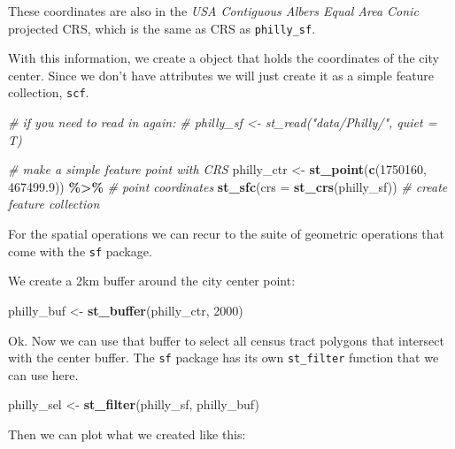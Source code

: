 \documentclass[
]{book}
\newenvironment{Shaded}{\begin{snugshade}}{\end{snugshade}}
\newcommand{\AttributeTok}[1]{\textcolor[rgb]{0.13,0.29,0.53}{#1}}
\newcommand{\CommentTok}[1]{\textcolor[rgb]{0.56,0.35,0.01}{\textit{#1}}}
\newcommand{\DecValTok}[1]{\textcolor[rgb]{0.00,0.00,0.81}{#1}}
\newcommand{\FloatTok}[1]{\textcolor[rgb]{0.00,0.00,0.81}{#1}}
\newcommand{\FunctionTok}[1]{\textcolor[rgb]{0.13,0.29,0.53}{\textbf{#1}}}
\newcommand{\NormalTok}[1]{#1}
\newcommand{\OtherTok}[1]{\textcolor[rgb]{0.56,0.35,0.01}{#1}}
\newcommand{\SpecialCharTok}[1]{\textcolor[rgb]{0.81,0.36,0.00}{\textbf{#1}}}
\begin{document}
These coordinates are also in the \emph{USA Contiguous Albers Equal Area Conic} projected CRS, which is the same as CRS as \texttt{philly\_sf}.

With this information, we create a object that holds the coordinates of the city center. Since we don't have attributes we will just create it as a simple feature collection, \texttt{scf}.

\begin{Shaded}
\begin{Highlighting}[]
\CommentTok{\# if you need to read in again:}
\CommentTok{\# philly\_sf \textless{}{-} st\_read("data/Philly/", quiet = T)}

\CommentTok{\# make a simple feature point with CRS}
\NormalTok{philly\_ctr }\OtherTok{\textless{}{-}} 
  \FunctionTok{st\_point}\NormalTok{(}\FunctionTok{c}\NormalTok{(}\DecValTok{1750160}\NormalTok{, }\FloatTok{467499.9}\NormalTok{)) }\SpecialCharTok{\%\textgreater{}\%} \CommentTok{\# point coordinates}
  \FunctionTok{st\_sfc}\NormalTok{(}\AttributeTok{crs =} \FunctionTok{st\_crs}\NormalTok{(philly\_sf))  }\CommentTok{\# create feature collection}
\end{Highlighting}
\end{Shaded}

For the spatial operations we can recur to the suite of geometric operations that come with the \texttt{sf} package.

We create a 2km buffer around the city center point:

\begin{Shaded}
\begin{Highlighting}[]
\NormalTok{philly\_buf }\OtherTok{\textless{}{-}} \FunctionTok{st\_buffer}\NormalTok{(philly\_ctr, }\DecValTok{2000}\NormalTok{)}
\end{Highlighting}
\end{Shaded}

Ok. Now we can use that buffer to select all census tract polygons that intersect with the center buffer. The \texttt{sf} package has its own \texttt{st\_filter} function that we can use here.

\begin{Shaded}
\begin{Highlighting}[]
\NormalTok{philly\_sel }\OtherTok{\textless{}{-}} \FunctionTok{st\_filter}\NormalTok{(philly\_sf, philly\_buf)}
\end{Highlighting}
\end{Shaded}

Then we can plot what we created like this:
\end{document}
